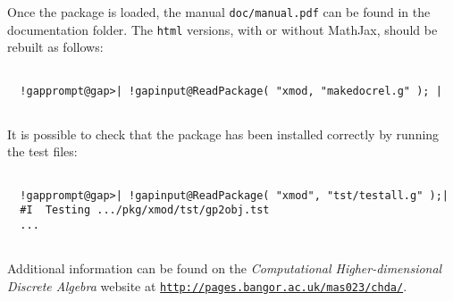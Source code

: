 \documentclass[a4paper,11pt]{report}
\begin{document}
{\begin{Verbatim}[commandchars=!@|,fontsize=\small,frame=single,label=Example]
\end{Verbatim}
 

 Once the package is loaded, the manual \texttt{doc/manual.pdf} can be found in the documentation folder. The \texttt{html} versions, with or without MathJax, should be rebuilt as follows: 

 
\begin{Verbatim}[commandchars=!@|,fontsize=\small,frame=single,label=Example]
  
  !gapprompt@gap>| !gapinput@ReadPackage( "xmod, "makedocrel.g" ); |
  
\end{Verbatim}
 

 It is possible to check that the package has been installed correctly by
running the test files: 

 
\begin{Verbatim}[commandchars=!@|,fontsize=\small,frame=single,label=Example]
  
  !gapprompt@gap>| !gapinput@ReadPackage( "xmod", "tst/testall.g" );|
  #I  Testing .../pkg/xmod/tst/gp2obj.tst 
  ... 
  
\end{Verbatim}
 

 Additional information can be found on the \emph{Computational Higher-dimensional Discrete Algebra} website at \href{http://pages.bangor.ac.uk/~mas023/chda/} {\texttt{http://pages.bangor.ac.uk/\texttt{}mas023/chda/}}. }

          
\end{document}
